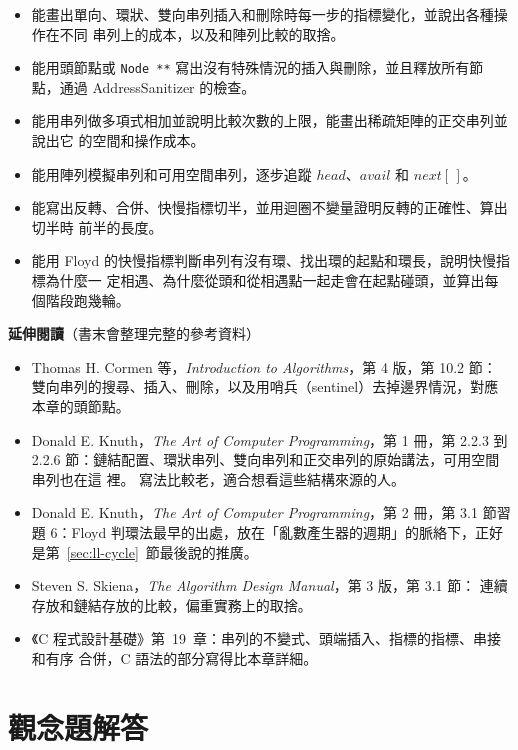\begin{itemize}
\item 能畫出單向、環狀、雙向串列插入和刪除時每一步的指標變化，並說出各種操作在不同
串列上的成本，以及和陣列比較的取捨。
\item 能用頭節點或 \texttt{Node **} 寫出沒有特殊情況的插入與刪除，並且釋放所有節
點，通過 AddressSanitizer 的檢查。
\item 能用串列做多項式相加並說明比較次數的上限，能畫出稀疏矩陣的正交串列並說出它
的空間和操作成本。
\item 能用陣列模擬串列和可用空間串列，逐步追蹤 $\mathit{head}$、$\mathit{avail}$ 和
$\mathit{next}[\,]$。
\item 能寫出反轉、合併、快慢指標切半，並用迴圈不變量證明反轉的正確性、算出切半時
前半的長度。
\item 能用 Floyd 的快慢指標判斷串列有沒有環、找出環的起點和環長，說明快慢指標為什麼一
定相遇、為什麼從頭和從相遇點一起走會在起點碰頭，並算出每個階段跑幾輪。
\end{itemize}

\textbf{延伸閱讀}（書末會整理完整的參考資料）

\begin{itemize}
\item Thomas H. Cormen 等，\textit{Introduction to Algorithms}，第 4 版，第 10.2 節：
雙向串列的搜尋、插入、刪除，以及用哨兵（sentinel）去掉邊界情況，對應本章的頭節點。
\item Donald E. Knuth，\textit{The Art of Computer Programming}，第 1 冊，第 2.2.3 到
2.2.6 節：鏈結配置、環狀串列、雙向串列和正交串列的原始講法，可用空間串列也在這
裡。 寫法比較老，適合想看這些結構來源的人。
\item Donald E. Knuth，\textit{The Art of Computer Programming}，第 2 冊，第 3.1 節習題
6：Floyd 判環法最早的出處，放在「亂數產生器的週期」的脈絡下，正好是第~\ref{sec:ll-cycle}~節最後說的推廣。
\item Steven S. Skiena，\textit{The Algorithm Design Manual}，第 3 版，第 3.1 節：
連續存放和鏈結存放的比較，偏重實務上的取捨。
\item 《C 程式設計基礎》第~19~章：串列的不變式、頭端插入、指標的指標、串接和有序
合併，C 語法的部分寫得比本章詳細。
\end{itemize}

\section*{觀念題解答}

